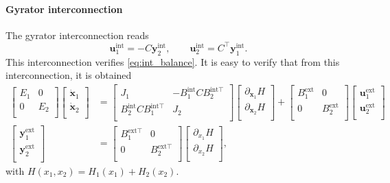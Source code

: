 \paragraph{Gyrator interconnection}
The gyrator interconnection reads
\begin{equation*}
\bm{u}_1^{\text{int}} = -{C} \bm{y}_2^{\text{int}}, \qquad
\bm{u}_2^{\text{int}} = {C}^\top \bm{y}_1^{\text{int}}.
\end{equation*}
This interconnection verifies \eqref{eq:int_balance}. It is easy to verify that from this interconnection, it is obtained
\begin{align*}
\begin{bmatrix}
E_1 & 0 \\ 0 & E_2 \\
\end{bmatrix}
\begin{bmatrix}
\dot{\bm{x}}_1 \\ \dot{\bm{x}}_2 \\
\end{bmatrix} &= 
\begin{bmatrix}
{J}_1 & -{B}_1^{\text{int}} {C} {B}_2^{\text{int} \top} \\ 
{B}_2^{\text{int}} {C} {B}_1^{\text{int} \top}  & {J}_2 \\
\end{bmatrix}
\begin{bmatrix}
\partial_{\bm{x}_1}{H} \\ 
\partial_{\bm{x}_2}{H} \\
\end{bmatrix}+ 
\begin{bmatrix}
{B}_1^{\text{ext}} & 0 \\ 0 & {B}_2^{\text{ext}} \\
\end{bmatrix} 
\begin{bmatrix}
\bm{u}_1^{\text{ext}} \\ \bm{u}_2^{\text{ext}} \\
\end{bmatrix}  \\
\begin{bmatrix}
\bm{y}_1^{\text{ext}} \\ \bm{y}_2^{\text{ext}} \\
\end{bmatrix}  &= \begin{bmatrix}
B_1^{\text{ext} \top} & 0 \\
0 & B_2^{\text{ext} \top} \\
\end{bmatrix} \begin{bmatrix}
\partial_{x_1}{H} \\ 
\partial_{x_2}{H} \\
\end{bmatrix},
\end{align*}
with $H(x_1, x_2) = H_1(x_1) + H_2(x_2)$.

